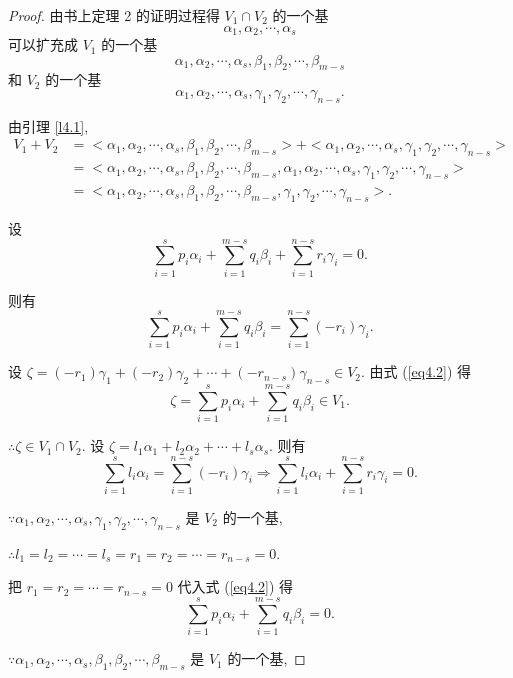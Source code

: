 \documentclass{ctexart}
\begin{document}
\begin{proof}
    由书上定理 2 的证明过程得 $V_1\cap V_2$ 的一个基
    \[\alpha_1,\alpha_2,\cdots,\alpha_s\]
    可以扩充成 $V_1$ 的一个基
    \[\alpha_1,\alpha_2,\cdots,\alpha_s,\beta_1,\beta_2,\cdots,\beta_{m-s}\]
    和 $V_2$ 的一个基
    \[\alpha_1,\alpha_2,\cdots,\alpha_s,\gamma_1,\gamma_2,\cdots,\gamma_{n-s}.\]

    由引理 \ref{l4.1},
    \begin{align*}
        V_1+V_2 & =<\alpha_1,\alpha_2,\cdots,\alpha_s,\beta_1,\beta_2,\cdots,\beta_{m-s}>+<\alpha_1,\alpha_2,\cdots,\alpha_s,\gamma_1,\gamma_2,\cdots,\gamma_{n-s}> \\
        & =<\alpha_1,\alpha_2,\cdots,\alpha_s,\beta_1,\beta_2,\cdots,\beta_{m-s},\alpha_1,\alpha_2,\cdots,\alpha_s,\gamma_1,\gamma_2,\cdots,\gamma_{n-s}> \\
        & =<\alpha_1,\alpha_2,\cdots,\alpha_s,\beta_1,\beta_2,\cdots,\beta_{m-s},\gamma_1,\gamma_2,\cdots,\gamma_{n-s}>.
    \end{align*}

    设
    \begin{equation}\label{eq4.2}
        \sum\limits_{i=1}^sp_i\alpha_i+\sum\limits_{i=1}^{m-s}q_i\beta_i+\sum\limits_{i=1}^{n-s}r_i\gamma_i=0.
    \end{equation}

    则有
    \[\sum\limits_{i=1}^sp_i\alpha_i+\sum\limits_{i=1}^{m-s}q_i\beta_i=\sum\limits_{i=1}^{n-s}(-r_i)\gamma_i.\]

    设 $\zeta=(-r_1)\gamma_1+(-r_2)\gamma_2+\cdots+(-r_{n-s})\gamma_{n-s}\in V_2$. 由式 (\ref{eq4.2}) 得
    \[\zeta=\sum\limits_{i=1}^sp_i\alpha_i+\sum\limits_{i=1}^{m-s}q_i\beta_i\in V_1.\]

    $\therefore\zeta\in V_1\cap V_2$. 设 $\zeta=l_1\alpha_1+l_2\alpha_2+\cdots+l_s\alpha_s$. 则有
    \[\sum\limits_{i=1}^sl_i\alpha_i=\sum\limits_{i=1}^{n-s}(-r_i)\gamma_i\Rightarrow\sum\limits_{i=1}^sl_i\alpha_i+\sum\limits_{i=1}^{n-s}r_i\gamma_i=0.\]

    $\because\alpha_1,\alpha_2,\cdots,\alpha_s,\gamma_1,\gamma_2,\cdots,\gamma_{n-s}$ 是 $V_2$ 的一个基,

    $\therefore l_1=l_2=\cdots=l_s=r_1=r_2=\cdots=r_{n-s}=0$.

    把 $r_1=r_2=\cdots=r_{n-s}=0$ 代入式 (\ref{eq4.2}) 得
    \[\sum\limits_{i=1}^sp_i\alpha_i+\sum\limits_{i=1}^{m-s}q_i\beta_i=0.\]

    $\because\alpha_1,\alpha_2,\cdots,\alpha_s,\beta_1,\beta_2,\cdots,\beta_{m-s}$ 是 $V_1$ 的一个基,


\end{proof}
\end{document}
